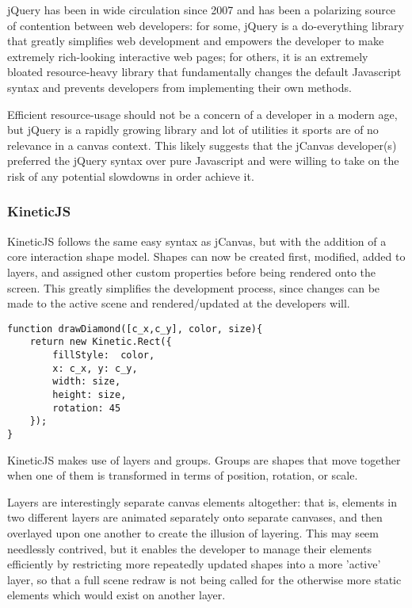jQuery has been in wide circulation since 2007 and has been a polarizing source of contention between web developers: for some, jQuery is a do-everything library that greatly simplifies web development and empowers the developer to make extremely rich-looking interactive web pages; for others, it is an extremely bloated resource-heavy library that fundamentally changes the default Javascript syntax and prevents developers from implementing their own methods.

Efficient resource-usage should not be a concern of a developer in a modern age, but jQuery is a rapidly growing library  and lot of utilities it sports are of no relevance in a canvas context. This likely suggests that the jCanvas developer(s) preferred the jQuery syntax over pure Javascript and were willing to take on the risk of any potential slowdowns in order achieve it.


\subsubsection{KineticJS}

KineticJS follows the same easy syntax as jCanvas, but with the addition of a core interaction shape model. Shapes can now be created first, modified, added to layers, and assigned other custom properties before being rendered onto the screen. This greatly simplifies the development process, since changes can be made to  the active scene and rendered/updated at the developers will. 

\begingroup
\begin{spacing}{1}
\begin{lstlisting}[label=code:kineticjs]
function drawDiamond([c_x,c_y], color, size){
	return new Kinetic.Rect({
		fillStyle:  color,
		x: c_x,	y: c_y,
		width: size,
		height: size,
		rotation: 45
	});
}
\end{lstlisting}
\vspace{-10pt}
\end{spacing}
\endgroup

KineticJS makes use of layers and groups. Groups are shapes that move together when one of them is transformed in terms of position, rotation, or scale\citep{kineticjs}. 

Layers are interestingly separate canvas elements altogether: that is, elements in two different layers are animated separately onto separate canvases, and then overlayed upon one another to create the illusion of layering.
This may seem needlessly contrived, but it enables the developer to manage their elements efficiently by restricting more repeatedly updated shapes into a more 'active' layer, so that a full scene redraw is not being called for the otherwise more static elements which would exist on another layer.

